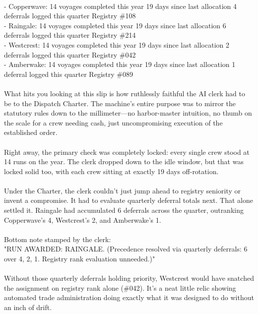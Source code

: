 \documentclass[9pt]{article}
\begin{document}
\begin{minipage}[t]{\textwidth}
\begin{minipage}[t]{0.49\textwidth}
\begin{exbox}
{  \  \\
  - Copperwave: 14 voyages completed this year \textbar{} 19 days since last allocation \textbar{} 4 deferrals logged this quarter \textbar{} Registry \#108 \\
  - Raingale: 14 voyages completed this year \textbar{} 19 days since last allocation \textbar{} 6 deferrals logged this quarter \textbar{} Registry \#214 \\
  - Westcrest: 14 voyages completed this year \textbar{} 19 days since last allocation \textbar{} 2 deferrals logged this quarter \textbar{} Registry \#042 \\
  - Amberwake: 14 voyages completed this year \textbar{} 19 days since last allocation \textbar{} 1 deferral logged this quarter \textbar{} Registry \#089 \\
  \  \\
  What hits you looking at this slip is how ruthlessly faithful the AI clerk had to be to the Dispatch Charter. The machine's entire purpose was to mirror the statutory rules down to the millimeter---no harbor-master intuition, no thumb on the scale for a crew needing cash, just uncompromising execution of the established order. \\
  \  \\
  Right away, the primary check was completely locked: every single crew stood at 14 runs on the year. The clerk dropped down to the idle window, but that was locked solid too, with each crew sitting at exactly 19 days off-rotation. \\
  \  \\
  Under the Charter, the clerk couldn't just jump ahead to registry seniority or invent a compromise. It had to evaluate quarterly deferral totals next. That alone settled it. Raingale had accumulated 6 deferrals across the quarter, outranking Copperwave's 4, Westcrest's 2, and Amberwake's 1. \\
  \  \\
  Bottom note stamped by the clerk: \\
  "RUN AWARDED: RAINGALE. (Precedence resolved via quarterly deferrals: 6 over 4, 2, 1. Registry rank evaluation unneeded.)" \\
  \  \\
  Without those quarterly deferrals holding priority, Westcrest would have snatched the assignment on registry rank alone (\#042). It's a neat little relic showing automated trade administration doing exactly what it was designed to do without an inch of drift.}
\end{exbox}
\end{minipage}
\end{minipage}
\clearpage
\end{document}
